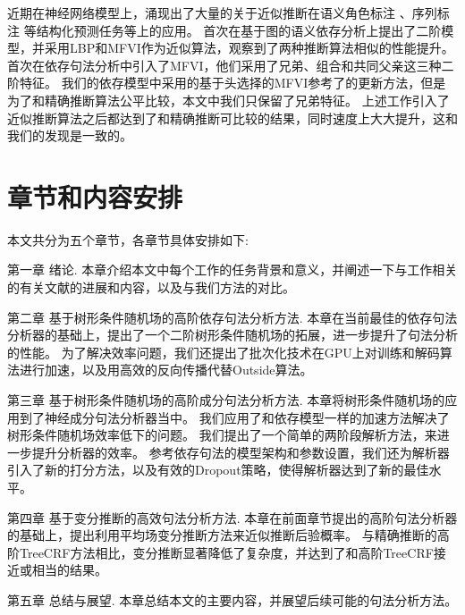 近期在神经网络模型上，涌现出了大量的关于近似推断在语义角色标注 \citep{li-etal-2020-high}、序列标注 \citep{wang-etal-2020-ain}等结构化预测任务等上的应用。
\citet{wang-etal-2019-second}首次在基于图的语义依存分析上提出了二阶模型，并采用LBP和MFVI作为近似算法，观察到了两种推断算法相似的性能提升。
\citet{wang-tu-2020-second}首次在依存句法分析中引入了MFVI，他们采用了兄弟、组合和共同父亲这三种二阶特征。
我们的依存模型中采用的基于头选择的MFVI参考了\citet{wang-tu-2020-second}的更新方法，但是为了和精确推断算法公平比较，本文中我们只保留了兄弟特征。
上述工作引入了近似推断算法之后都达到了和精确推断可比较的结果，同时速度上大大提升，这和我们的发现是一致的。

\section{章节和内容安排}

本文共分为五个章节，各章节具体安排如下:

第一章 绪论.
本章介绍本文中每个工作的任务背景和意义，并阐述一下与工作相关的有关文献的进展和内容，以及与我们方法的对比。

第二章 基于树形条件随机场的高阶依存句法分析方法.
本章在当前最佳的依存句法分析器的基础上，提出了一个二阶树形条件随机场的拓展，进一步提升了句法分析的性能。
为了解决效率问题，我们还提出了批次化技术在GPU上对训练和解码算法进行加速，以及用高效的反向传播代替Outside算法。

第三章 基于树形条件随机场的高阶成分句法分析方法.
本章将树形条件随机场的应用到了神经成分句法分析器当中。
我们应用了和依存模型一样的加速方法解决了树形条件随机场效率低下的问题。
我们提出了一个简单的两阶段解析方法，来进一步提升分析器的效率。
参考依存句法的模型架构和参数设置，我们还为解析器引入了新的打分方法，以及有效的Dropout策略，使得解析器达到了新的最佳水平。

第四章 基于变分推断的高效句法分析方法.
本章在前面章节提出的高阶句法分析器的基础上，提出利用平均场变分推断方法来近似推断后验概率。
与精确推断的高阶TreeCRF方法相比，变分推断显著降低了复杂度，并达到了和高阶TreeCRF接近或相当的结果。

第五章 总结与展望.
本章总结本文的主要内容，并展望后续可能的句法分析方法。
